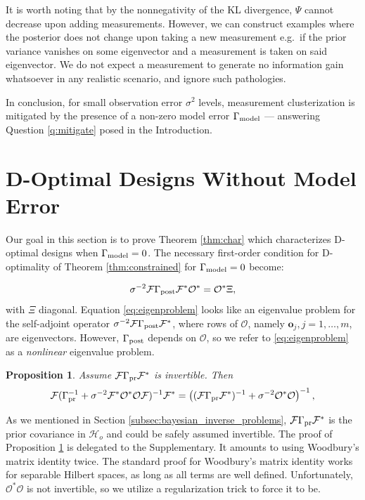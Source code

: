 \documentclass[ba]{imsart}
\newcommand{\hilo}{\mathcal{H}_o}
\newcommand{\obs}{\mathcal{O}}
\newcommand{\fwd}{\mathcal{F}}
\newcommand{\tar}{\Psi}
\newcommand{\meas}{\mathbf{o}}
\theoremstyle{plain}
\newtheorem{proposition}[theorem]{Proposition}
\theoremstyle{definition}
\theoremstyle{remark}
\begin{document}
It is worth noting that by the nonnegativity of the KL divergence,
$\tar$ cannot decrease upon adding measurements. However, we can
construct examples where the posterior does not change upon taking a
new measurement e.g.~if the prior variance vanishes on some
eigenvector and a measurement is taken on said eigenvector. We do not
expect a measurement to generate no information gain whatsoever in any
realistic scenario, and ignore such pathologies.

In conclusion, for small observation error $\sigma^2$ levels,
measurement clusterization is mitigated by the presence of a non-zero
model error $\Gamma_{\textup{model}}$ --- answering Question \ref{q:mitigate} posed in
the Introduction. \section{D-Optimal Designs Without Model Error}\label{section:vanishing}
Our goal in this section is to prove Theorem \ref{thm:char} which
characterizes D-optimal designs when $\Gamma_{\textup{model}} = 0$. The necessary
first-order condition for D-optimality of Theorem
\ref{thm:constrained} for $\Gamma_{\textup{model}} = 0$ become:

\begin{equation}\label{eq:eigenproblem}
  \sigma^{-2}\fwd \postcov \fwd^* \obs^* = \obs^* \Xi,
\end{equation}
with $\Xi$ diagonal. Equation \eqref{eq:eigenproblem} looks like an
eigenvalue problem for the self-adjoint operator $\sigma^{-2}\fwd
\postcov \fwd^*$, where rows of $\obs$, namely $\meas_j,j=1,\dots, m$,
are eigenvectors. However, $\Gamma_{\textup{post}}$ depends on $\obs$, so we refer
to \eqref{eq:eigenproblem} as a \emph{nonlinear} eigenvalue problem.


\begin{proposition}\label{prop:twice_woodbury}
  Assume $\fwd \prcov \fwd^*$ is invertible. Then
  \begin{align*}
    \begin{split}
      \fwd( \prcov^{-1} + \sigma^{-2}  \fwd^* \obs^* \obs \fwd )^{-1} \fwd^* 
= \left ( (\fwd\prcov\fwd^*)^{-1} + \sigma^{-2}  \obs^* \obs \right )^{-1},
    \end{split}
  \end{align*}  
\end{proposition}

As we mentioned in Section \ref{subsec:bayesian_inverse_problems},
$\fwd \prcov \fwd^*$ is the prior covariance in $\hilo$ and could be
safely assumed invertible. The proof of Proposition
\ref{prop:twice_woodbury} is delegated to the Supplementary. It
amounts to using Woodbury's matrix identity twice. The standard proof
for Woodbury's matrix identity works for separable Hilbert spaces, as
long as all terms are well defined. Unfortunately, $\obs^*\obs$ is not
invertible, so we utilize a regularization trick to force it to be.
\end{document}
